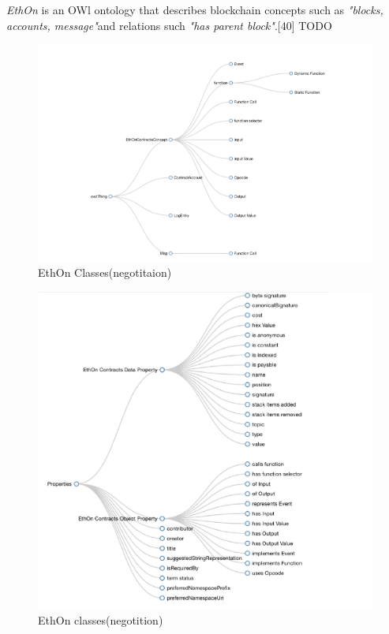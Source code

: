  \textit{EthOn} is an OWl ontology that describes blockchain concepts such as \textit{"blocks, accounts, message"}and relations such \textit{"has parent block"}.[40] TODO
 \begin{center}
 	\begin{figure}[htb!]
 		
 		\begin{minipage}{0.55\linewidth}
 			\centering
 			\includegraphics[width=1.85\textwidth]{images/chap01_EthOn.png}
 		\end{minipage}
 		\caption[EthOn classes]{EthOn Classes(negotitaion)}
 	
 	\end{figure}

 	\begin{figure}[htb!]
 		
 		\begin{minipage}{0.55\linewidth}
 			\centering
 			\includegraphics[width=1.65\textwidth]{images/chap02_EthOn_Properties.png}
 		\end{minipage}
 		\caption[EthOn Properties]{EthOn classes(negotition)}
 		
 		
 	\end{figure}
 	
 \end{center}

